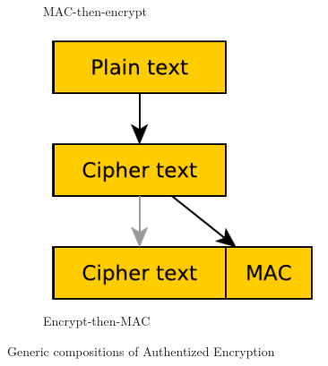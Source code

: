 \begin{figure}
\begin{subfigure}[b]{0.3\textwidth}
    \caption{MAC-then-encrypt}
  \end{subfigure}
  \begin{subfigure}[b]{0.3\textwidth}
    \centering
    \includegraphics[width=0.9\textwidth]{images/encrypt-then-mac.pdf}
    \caption{Encrypt-then-MAC}
  \end{subfigure}
  \caption{Generic compositions of Authentized Encryption}
\end{figure}
